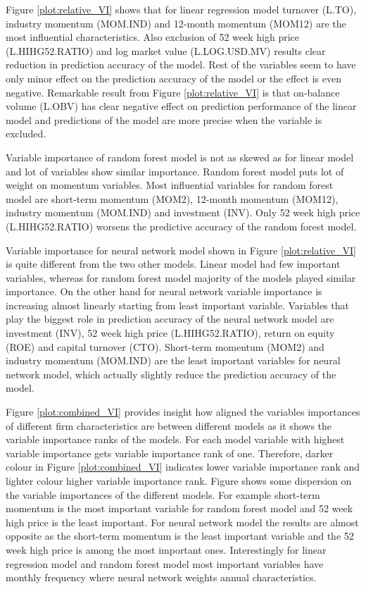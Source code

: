 \documentclass{article}
\begin{document}
Figure \ref{plot:relative_VI} shows that for linear regression model turnover (L.TO), industry momentum (MOM.IND) and 12-month momentum (MOM12) are the most influential characteristics. Also exclusion of 52 week high price (L.HIHG52.RATIO) and log market value (L.LOG.USD.MV) results clear reduction in prediction accuracy of the model. Rest of the variables seem to have only minor effect on the prediction accuracy of the model or the effect is even negative. Remarkable result from Figure \ref{plot:relative_VI} is that on-balance volume (L.OBV) has clear negative effect on prediction performance of the linear model and predictions of the model are more precise when the variable is excluded. \par

Variable importance of random forest model is not as skewed as for linear model and lot of variables show similar importance. Random forest model puts lot of weight on momentum variables. Most influential variables for random forest model are short-term momentum (MOM2), 12-month momentum (MOM12), industry momentum (MOM.IND) and investment (INV). Only 52 week high price (L.HIHG52.RATIO) worsens the predictive accuracy of the random forest model. \par

Variable importance for neural network model shown in Figure \ref{plot:relative_VI} is quite different from the two other models. Linear model had few important variables, whereas for random forest model majority of the models played similar importance. On the other hand for neural network variable importance is increasing almost linearly starting from least important variable. Variables that play the biggest role in prediction accuracy of the neural network model are investment (INV), 52 week high price (L.HIHG52.RATIO), return on equity (ROE) and capital turnover (CTO). Short-term momentum (MOM2) and industry momentum (MOM.IND) are the least important variables for neural network model, which actually slightly reduce the prediction accuracy of the model. \par 

Figure \ref{plot:combined_VI} provides insight how aligned the variables importances of different firm characteristics are between different models as it shows the variable importance ranks of the models. For each model variable with highest variable importance gets variable importance rank of one. Therefore, darker colour in Figure \ref{plot:combined_VI} indicates lower variable importance rank and lighter colour higher variable importance rank. Figure shows some dispersion on the variable importances of the different models. For example short-term momentum is the most important variable for random forest model and 52 week high price is the least important. For neural network model the results are almost opposite as the short-term momentum is the least important variable and the 52 week high price is among the most important ones. Interestingly for linear regression model and random forest model most important variables have monthly frequency where neural network weights annual characteristics. \par
\end{document}
